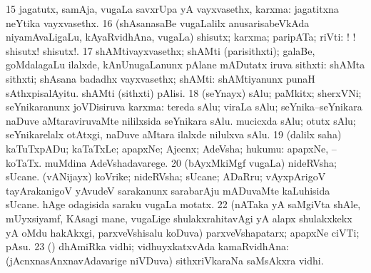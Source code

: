 \num{15} jagatutx, samAja, \mo vugaLa savxrUpa yA vayxvasethx, karxma:  jagatitxna neYtika vayxvasethx. 
\num{16} (shAsanasaBe \mo vugaLalilx anusarisabeVkAda niyamAvaLigaLu, kAyaRvidhAna, \mo vugaLa) shisutx; karxma; paripATa; riVti: ! ! shisutx! shisutx!. 
\num{17} shAMtivayxvasethx; shAMti (parisithxti); galaBe, goMdalagaLu ilalxde, kAnUnugaLanunx pAlane mADutatx iruva sithxti:  shAMta sithxti; shAsana badadhx vayxvasethx; shAMti:  shAMtiyanunx punaH sAthxpisalAyitu.  shAMti (sithxti) pAlisi. 
\num{18} (seYnayx) sAlu; paMkitx; sherxVNi; seYnikaranunx joVDisiruva karxma:  tereda sAlu; viraLa sAlu; seYnika--seYnikara naDuve aMtaraviruvaMte nililxsida seYnikara sAlu.  mucicxda sAlu; otutx sAlu; seYnikarelalx otAtxgi, naDuve aMtara ilalxde nilulxva sAlu. 
\num{19} (\bava dalilx saha) kaTuTxpADu; kaTaTxLe; apapxNe; Ajecnx; AdeVsha; hukumu:  apapxNe, --koTaTx.  muMdina AdeVshadavarege. 
\num{20} (bAyxMkiMgf \mo vugaLa) nideRVsha; sUcane. 
 (vANijayx) 
\banum
{} koVrike; nideRVsha; sUcane; ADaRru; vAyxpArigoV tayArakanigoV yAvudeV sarakanunx sarabarAju mADuvaMte kaLuhisida sUcane. 
 hAge odagisida saraku \mo vugaLa motatx. 
\eanum
\numie
\num{22} (nATaka yA saMgiVta shAle, mUyxsiyamf, KAsagi mane, \mo vugaLige shulakxrahitavAgi yA alapx shulakxkekx yA oMdu hakAkxgi, parxveVshisalu koDuva) parxveVshapatarx; apapxNe ciVTi; pAsu. 
\num{23} (\kerxY) dhAmiRka vidhi; vidhuyxkatxvAda kamaRvidhAna:  (jAcnxnasAnxnavAdavarige niVDuva) sithxriVkaraNa saMsAkxra vidhi. 
\enum
\emng

